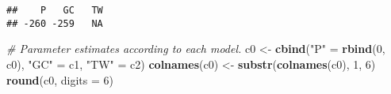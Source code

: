 \documentclass[9pt,a5paper,]{book}
\newenvironment{Shaded}{}{}
\newcommand{\KeywordTok}[1]{\textbf{{#1}}}
\newcommand{\DataTypeTok}[1]{\underline{{#1}}}
\newcommand{\DecValTok}[1]{{#1}}
\newcommand{\StringTok}[1]{{#1}}
\newcommand{\CommentTok}[1]{\textit{{#1}}}
\newcommand{\NormalTok}[1]{{#1}}
\renewenvironment{Shaded}{\color{inputcolor}}{}
\renewcommand{\DataTypeTok}[1]{{#1}}
\theoremstyle{definition}
\theoremstyle{definition}
\theoremstyle{remark}
\begin{document}
\begin{verbatim}
##    P   GC   TW 
## -260 -259   NA
\end{verbatim}

\begin{Shaded}
\end{Shaded}

\begin{Shaded}
\begin{Highlighting}[]
\CommentTok{# Parameter estimates according to each model.}
\NormalTok{c0 <-}\StringTok{ }\KeywordTok{cbind}\NormalTok{(}\StringTok{"P"} \NormalTok{=}\StringTok{ }\KeywordTok{rbind}\NormalTok{(}\DecValTok{0}\NormalTok{, c0),}
            \StringTok{"GC"} \NormalTok{=}\StringTok{ }\NormalTok{c1,}
            \StringTok{"TW"} \NormalTok{=}\StringTok{ }\NormalTok{c2)}
\KeywordTok{colnames}\NormalTok{(c0) <-}\StringTok{ }\KeywordTok{substr}\NormalTok{(}\KeywordTok{colnames}\NormalTok{(c0), }\DecValTok{1}\NormalTok{, }\DecValTok{6}\NormalTok{)}
\KeywordTok{round}\NormalTok{(c0, }\DataTypeTok{digits =} \DecValTok{6}\NormalTok{)}
\end{Highlighting}
\end{Shaded}
\end{document}
